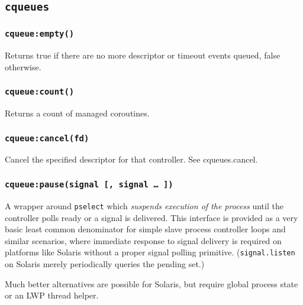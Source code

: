 \documentclass[11pt, oneside]{memoir}
\newcommand{\cqueues}[0]{\texttt{cqueues} }
\newcommand{\syscall}[1]{\texttt{#1} }
\newcommand{\routine}[1]{\texttt{#1} }
\newcounter{toccols}
\newenvironment{Module}[1]{
	\subsection{\texttt{#1}}
	\addtocontents{toc}{
		\protect\begin{multicols}{\value{toccols}}
	}
}{
	\addtocontents{toc}{\protect\end{multicols}}
}
\begin{document}
\begin{Module}{\cqueues}
\subsubsection[\routine{cqueues:empty}]{\routine{cqueue:empty()}}
Returns true if there are no more descriptor or timeout events queued, false otherwise.

\subsubsection[\routine{cqueues:count}]{\routine{cqueue:count()}}
Returns a count of managed coroutines.

\subsubsection[\routine{cqueues:cancel}]{\routine{cqueue:cancel(fd)}}
Cancel the specified descriptor for that controller. See cqueues.cancel.

\subsubsection[\routine{cqueues:pause}]{\routine{cqueue:pause(signal [, signal … ])}}
A wrapper around \syscall{pselect} which \emph{suspends execution of the process} until the controller polls ready or a signal is delivered. This interface is provided as a very basic least common denominator for simple slave process controller loops and similar scenarios, where immediate response to signal delivery is required on platforms like Solaris without a proper signal polling primitive. (\routine{signal.listen} on Solaris merely periodically queries the pending set.)

Much better alternatives are possible for Solaris, but require global process state or an LWP thread helper.

\end{Module}
\end{document}
